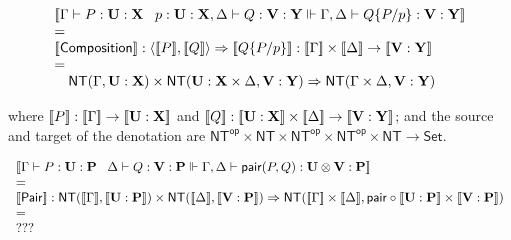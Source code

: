 $$\begin{array}{l}
  \meaningof{\Gamma \vdash P : \mathbf{U} : \mathbf {X} \;\;\; p : \mathbf{U} : \mathbf {X}, \Delta \vdash Q : \mathbf{V} : \mathbf {Y} \Vdash \Gamma, \Delta \vdash Q \substn{P}{p} : \mathbf{V} : \mathbf {Y}} \\
  = \\
  \meaningof{\mathsf{Composition}} : \langle \meaningof{P}, \meaningof{Q} \rangle \Rightarrow \meaningof{Q\substn{P}{p}} : \meaningof{\Gamma} \times \meaningof{\Delta} \to \meaningof{\mathbf{V} : \mathbf{Y}} \\
  = \\
  \quad \mathsf{NT}(\Gamma,\mathbf{U} : \mathbf {X}) \times \mathsf{NT}(\mathbf{U} : \mathbf {X} \times \Delta, \mathbf{V} : \mathbf {Y}) \Rightarrow \mathsf{NT}(\Gamma \times \Delta, \mathbf{V} : \mathbf {Y})
\end{array}$$

where $[\![ P ]\!] : [\![ \Gamma ]\!] \to [\![ \mathbf{U} : \mathbf{X} ]\!]$ and $ \meaningof{Q} : \meaningof{\mathbf{U} : \mathbf{X}} \times \meaningof{\Delta} \to \meaningof{\mathbf{V} : \mathbf{Y}}$; and the source and target of the denotation are $\mathsf{NT}^{\mathsf{op}} \times \mathsf{NT} \times \mathsf{NT}^{\mathsf{op}} \times \mathsf{NT}^{\mathsf{op}} \times \mathsf{NT} \to \mathsf{Set}$.

$$\begin{array}{l}
  \meaningof{\Gamma \vdash P : \mathbf{U} : \mathbf {P} \;\;\; \Delta \vdash Q : \mathbf{V} : \mathbf {P} \Vdash \Gamma,\Delta \vdash \mathsf{pair}( P,Q ) : \mathbf{U} \otimes \mathbf{V} : \mathbf {P}} \\
  = \\
  \meaningof{\mathsf{Pair}} : \mathsf{NT}(\meaningof{\Gamma},\meaningof{\mathbf{U}:\mathbf{P}}) \times \mathsf{NT}(\meaningof{\Delta},\meaningof{\mathbf{V}:\mathbf{P}}) \Rightarrow \mathsf{NT}(\meaningof{\Gamma} \times \meaningof{\Delta},\mathsf{pair} \circ \meaningof{\mathbf{U}:\mathbf{P}} \times \meaningof{\mathbf{V}:\mathbf{P}}) \\
  = \\
  ??? \\
\end{array}$$


